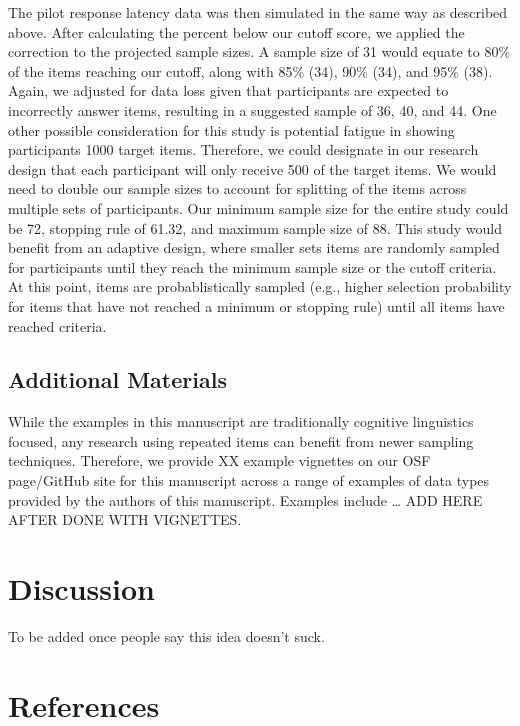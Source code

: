 \documentclass[
  man]{apa6}
\newlength{\cslhangindent}
\newlength{\cslentryspacingunit} %
\newenvironment{CSLReferences}[2] %
 {%
  \setlength{\parindent}{0pt}
  \ifodd #1
  \let\oldpar\par
  \def\par{\hangindent=\cslhangindent\oldpar}
  \fi
  \setlength{\parskip}{#2\cslentryspacingunit}
 }%
 {}
\begin{document}
The pilot response latency data was then simulated in the same way as described above. After calculating the percent below our cutoff score, we applied the correction to the projected sample sizes. A sample size of 31 would equate to 80\% of the items reaching our cutoff, along with 85\% (34), 90\% (34), and 95\% (38). Again, we adjusted for data loss given that participants are expected to incorrectly answer items, resulting in a suggested sample of 36, 40, and 44. One other possible consideration for this study is potential fatigue in showing participants 1000 target items. Therefore, we could designate in our research design that each participant will only receive 500 of the target items. We would need to double our sample sizes to account for splitting of the items across multiple sets of participants. Our minimum sample size for the entire study could be 72, stopping rule of 61.32, and maximum sample size of 88. This study would benefit from an adaptive design, where smaller sets items are randomly sampled for participants until they reach the minimum sample size or the cutoff criteria. At this point, items are probablistically sampled (e.g., higher selection probability for items that have not reached a minimum or stopping rule) until all items have reached criteria.

\hypertarget{additional-materials}{%
\subsection{Additional Materials}\label{additional-materials}}

While the examples in this manuscript are traditionally cognitive linguistics focused, any research using repeated items can benefit from newer sampling techniques. Therefore, we provide XX example vignettes on our OSF page/GitHub site for this manuscript across a range of examples of data types provided by the authors of this manuscript. Examples include \ldots{} ADD HERE AFTER DONE WITH VIGNETTES.

\hypertarget{discussion}{%
\section{Discussion}\label{discussion}}

To be added once people say this idea doesn't suck.

\newpage

\hypertarget{references}{%
\section{References}\label{references}}

\begingroup
\setlength{\parindent}{-0.5in}
\setlength{\leftskip}{0.5in}

\hypertarget{refs}{}
\begin{CSLReferences}{0}{0}
\end{CSLReferences}

\endgroup
\end{document}
